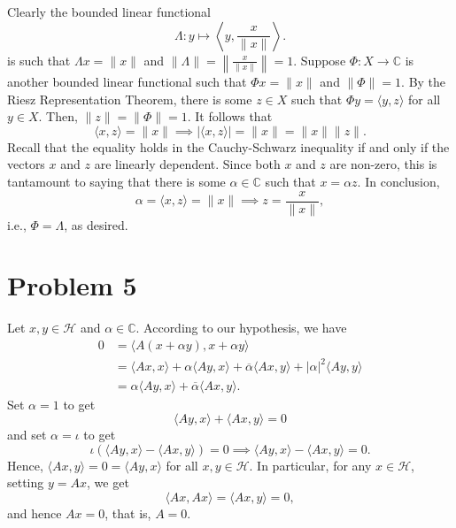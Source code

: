 \documentclass[10pt]{amsart}
\theoremstyle{thmstyle}
\theoremstyle{defstyle}
\newcommand{\bbC}{\mathbb{C}}
\newcommand{\calH}{\mathcal{H}} %
\begin{document}
Clearly the bounded linear functional 
\begin{equation*}
    \Lambda\colon y\longmapsto\left\langle y,\frac{x}{\|x\|}\right\rangle.
\end{equation*}
is such that $\Lambda x = \|x\|$ and $\|\Lambda\| = \left\|\frac{x}{\|x\|}\right\| = 1$. Suppose $\Phi: X\to\bbC$ is another bounded linear functional such that $\Phi x = \|x\|$ and $\|\Phi\| = 1$. By the Riesz Representation Theorem, there is some $z\in X$ such that $\Phi y = \langle y,z \rangle$ for all $y\in X$. Then, $\|z\| = \|\Phi\| = 1$. It follows that 
\begin{equation*}
    \langle x, z\rangle = \|x\|\implies|\langle x, z\rangle| = \|x\| = \|x\|\|z\|.
\end{equation*}
Recall that the equality holds in the Cauchy-Schwarz inequality if and only if the vectors $x$ and $z$ are linearly dependent. Since both $x$ and $z$ are non-zero, this is tantamount to saying that there is some $\alpha\in\bbC$ such that $x = \alpha z$. In conclusion, 
\begin{equation*}
    \alpha = \langle x, z\rangle = \|x\|\implies z = \frac{x}{\|x\|},
\end{equation*}
i.e., $\Phi = \Lambda$, as desired.


\section{Problem 5}

Let $x,y\in\calH$ and $\alpha\in\bbC$. According to our hypothesis, we have 
\begin{align*}
    0 &= \langle A(x + \alpha y), x + \alpha y\rangle\\
    &= \langle Ax, x\rangle + \alpha\langle Ay, x\rangle + \overline\alpha\langle Ax, y\rangle + |\alpha|^2\langle Ay, y\rangle\\
    &= \alpha\langle Ay, x\rangle + \overline\alpha\langle Ax, y\rangle.
\end{align*}
Set $\alpha = 1$ to get 
\begin{equation*}
    \langle Ay, x\rangle + \langle Ax, y\rangle = 0
\end{equation*}
and set $\alpha = \iota$ to get 
\begin{equation*}
    \iota\left(\langle Ay, x\rangle - \langle Ax, y\rangle\right) = 0\implies\langle Ay, x\rangle - \langle Ax, y\rangle = 0.
\end{equation*}
Hence, $\langle Ax, y\rangle = 0 = \langle Ay, x\rangle$ for all $x, y\in\calH$. In particular, for any $x\in\calH$, setting $y = Ax$, we get 
\begin{equation*}
    \langle Ax, Ax\rangle = \langle Ax, y\rangle = 0,
\end{equation*}
and hence $Ax = 0$, that is, $A = 0$.
\end{document}
